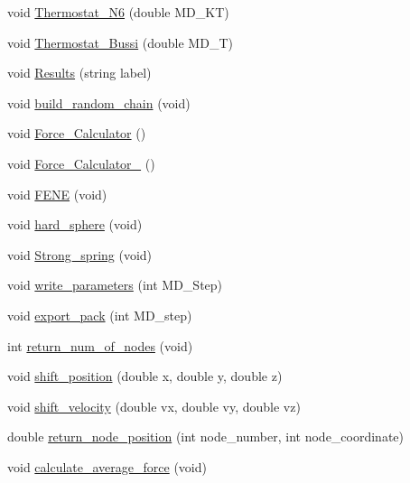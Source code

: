 \begin{DoxyCompactItemize}
\item 
void \mbox{\hyperlink{classChromatin_a1bdebb39143cec34dcf0d4f9b5252a71}{Thermostat\+\_\+\+N6}} (double M\+D\+\_\+\+KT)
\item 
void \mbox{\hyperlink{classChromatin_a0ab8a63487a5f0a955e0e72a67202687}{Thermostat\+\_\+\+Bussi}} (double M\+D\+\_\+T)
\item 
void \mbox{\hyperlink{classChromatin_a93559682020c26033dc0b4cdbff774f9}{Results}} (string label)
\item 
void \mbox{\hyperlink{classChromatin_ae3f17fd0b51db84a3890105f8f4a7028}{build\+\_\+random\+\_\+chain}} (void)
\item 
void \mbox{\hyperlink{classChromatin_a37cf6dcb2eca02312739e4b14e48c2b9}{Force\+\_\+\+Calculator}} ()
\item 
void \mbox{\hyperlink{classChromatin_a6afb5d9eb8c4d6e1c9e8145e1bccad6c}{Force\+\_\+\+Calculator\+\_}} ()
\item 
void \mbox{\hyperlink{classChromatin_a22b0a397c521e9775a0fedc027aaf709}{F\+E\+NE}} (void)
\item 
void \mbox{\hyperlink{classChromatin_aba53b27dd0a93bbd93fe619390e54749}{hard\+\_\+sphere}} (void)
\item 
void \mbox{\hyperlink{classChromatin_a9f8de53b9b39438ed966a9ad7cd5c962}{Strong\+\_\+spring}} (void)
\item 
void \mbox{\hyperlink{classChromatin_a2466415eebdaa0d409c8e6df432ebe9c}{write\+\_\+parameters}} (int M\+D\+\_\+\+Step)
\item 
void \mbox{\hyperlink{classChromatin_a73cbccc73e3676425082c8c233919ee0}{export\+\_\+pack}} (int M\+D\+\_\+step)
\item 
int \mbox{\hyperlink{classChromatin_adaea32233fd4347b7ba86fb9df18ed18}{return\+\_\+num\+\_\+of\+\_\+nodes}} (void)
\item 
void \mbox{\hyperlink{classChromatin_a701278cbb0c1014ae62f479e2a9f6737}{shift\+\_\+position}} (double x, double y, double z)
\item 
void \mbox{\hyperlink{classChromatin_a49adafb5a81413b23a66f3a59d49d59c}{shift\+\_\+velocity}} (double vx, double vy, double vz)
\item 
double \mbox{\hyperlink{classChromatin_a90039618de9196e41f9c77de1b5fce0e}{return\+\_\+node\+\_\+position}} (int node\+\_\+number, int node\+\_\+coordinate)
\item 
void \mbox{\hyperlink{classChromatin_aa3e429b42938181fcd2fa156468c4b29}{calculate\+\_\+average\+\_\+force}} (void)
\item 

\end{DoxyCompactItemize}
